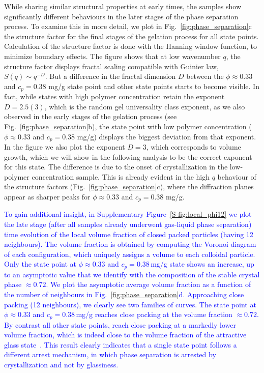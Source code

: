 \documentclass[preprint,amsmath,amssymb,superscriptaddress]{revtex4-1}
\begin{document}
While sharing similar structural properties at early times, the samples show significantly different behaviours in the later stages of the phase separation process.
To examine this in more detail, we plot in Fig.~\ref{fig:phase_separation}c the structure factor for the final stages of the gelation process for all state points.
Calculation of the structure factor is done with the Hanning window function, to minimize boundary effects.
The figure shows that at low wavenumber $q$, the structure factor displays fractal scaling compatible with Guinier law, $S(q)\sim q^{-D}$.
But a difference in the fractal dimension $D$ between the $\phi\approx 0.33$ and $c_p=0.38$ mg/g state point and other state points starts to become visible. In fact, while states
with high polymer concentration retain the exponent $D=2.5(3)$, 
which is the random gel universality class exponent, as we also observed in the early stages of the gelation process (see Fig.~\ref{fig:phase_separation}b),
the state point with low polymer concentration ($\phi\approx 0.33$ and $c_p=0.38$ mg/g) displays the biggest deviation from that exponent. In the figure we also
plot the exponent $D=3$, which corresponds to volume growth, which we will show in the following analysis to be the correct exponent for this state. 
The difference is due to the onset of crystallization in the low-polymer concentration sample. This is already evident in the high $q$ behaviour of
the structure factors (Fig.~\ref{fig:phase_separation}c), where the diffraction planes appear as sharper peaks for $\phi\approx 0.33$ and $c_p=0.38$ mg/g.

\textcolor{blue}{To gain additional insight, in Supplementary Figure~\ref{S-fig:local_phi12} we plot the late stage (after all samples already underwent gas-liquid phase separation) time evolution of the local volume fraction of closed packed particles (having 12 neighbours). The volume fraction is obtained by computing the Voronoi diagram of each configuration, which uniquely assigns a volume to each colloidal particle. Only the state point at $\phi\approx 0.33$ and $c_p = 0.38\,$mg/g state shows an increase, up to an asymptotic value that we identify with the composition of the stable crystal phase $\approx 0.72$. We plot the asymptotic average volume fraction as a function of the number of neighbours in Fig.~\ref{fig:phase_separation}d. Approaching close packing (12 neighbours), we clearly see two families of curves. The state point at $\phi\approx 0.33$ and $c_p=0.38\,$mg/g reaches close packing at the volume fraction $\approx 0.72$. By contrast all other state points, reach close packing at a markedly lower volume fraction, which is indeed close to the volume fraction of the attractive glass state~\cite{pham2002multiple}. This result clearly indicates that a single state point follows a different arrest mechanism, in which phase separation is arrested by crystallization and not by glassiness.}
\end{document}
